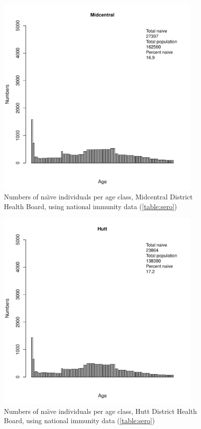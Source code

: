 \documentclass{article}
\begin{document}
\begin{figure}[H]
     \begin{center}
     \includegraphics[width=0.9\textwidth]{dhb12.pdf}
     \end{center}
     \caption{Numbers of na\"{\i}ve individuals per age class, Midcentral District Health Board, using national immunity data (\autoref{table:sero})}
     \label{fig:Midcentral}
\end{figure}

\begin{figure}[H]
     \begin{center}
     \includegraphics[width=0.9\textwidth]{dhb13.pdf}
     \end{center}
     \caption{Numbers of na\"{\i}ve individuals per age class, Hutt District Health Board, using national immunity data (\autoref{table:sero})}
     \label{fig:Hutt}
\end{figure}
\end{document}

